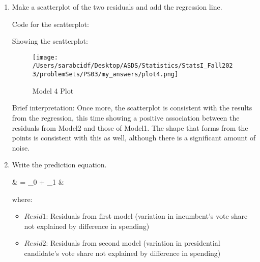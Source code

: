 \documentclass[12pt,letterpaper]{article}
\begin{document}
\begin{enumerate}
		\item Make a scatterplot of the two residuals and add the regression line. 	\vspace{.25cm}
		
		Code for the scatterplot: 
		
		
		Showing the scatterplot: 
		\begin{figure}[H]
			\centering
			\texttt{[image: /Users/sarabcidf/Desktop/ASDS/Statistics/StatsI\_Fall2023/problemSets/PS03/my\_answers/plot4.png]}
			\caption{Model 4 Plot}
		\end{figure}
		
		Brief interpretation: 
		Once more, the scatterplot is consistent with the results from the regression, this time showing a positive association between the residuals from Model2 and those of Model1. The shape that forms from the points is consistent with this as well, although there is a significant amount of noise. 
		
		\item Write the prediction equation.
		
		{\setlength{\abovedisplayskip}{2pt} 
			\setlength{\belowdisplayskip}{6pt} 
			
			\begin{flalign*}
				& = \beta_0 + \beta_1 \cdot {}  &
			\end{flalign*}
			
			where: 
			
			\begin{itemize}
				\item $Resid1$: Residuals from first model (variation in incumbent's vote share not explained by difference in spending)
				\item $Resid2$: Residuals from second model (variation in presidential candidate's vote share not explained by difference in spending)
			\end{itemize}
		}
		
	\end{enumerate}
	
	\newpage	
\end{document}
